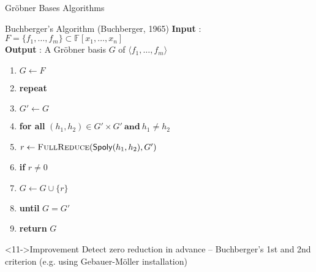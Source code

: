 \documentclass{beamer}
\newcommand{\Field}{\mathbb{F}}
\newcommand{\Ideal}[1]{\langle #1 \rangle}
\newcommand{\mpolyring}[3]{#1[#2_{1}, \ldots, #2_{#3}]}
\newcommand{\Spoly}[2]{\mathsf{Spoly}(#1, #2)}
\newcommand{\Grobner}{Gr\"{o}bner }
\newcommand{\Alg}[2]{\textsc{#1}(#2)}
\newcommand{\FullReduce}[1]{\Alg{FullReduce}{#1}}
\begin{document}
\begin{section}{\Grobner Bases Algorithms}



\begin{frame}{Buchberger's Algorithm (Buchberger, 1965)}
  \textbf{Input} : $F = \{ f_1, \ldots, f_m \} \subset \mpolyring{\Field}{x}{n}$\\
  \textbf{Output} : A \Grobner basis $G$ of $\Ideal{f_1, \ldots, f_m}$

  \begin{enumerate}
  \item<2-> $G \leftarrow F$
  \item<3-> \textbf{repeat}
  \item<4-> \quad $G' \leftarrow G$
  \item<5-> \quad \textbf{for all}
    $(h_1, h_2) \in G' \times G' \mathbf{\ and\ } h_1 \neq h_2$
  \item<6-> \qquad $r \leftarrow \FullReduce{ \Spoly{h_1}{h_2} , G'}$
  \item<7-> \qquad \textbf{if} $r \neq 0$
  \item<8-> \quad \qquad $G \leftarrow G \cup \{ r \}$
  \item<9-> \textbf{until} $G = G'$
  \item<10-> \textbf{return} $G$
  \end{enumerate}
  
  \begin{block}<11->{Improvement} Detect zero reduction in advance --
    Buchberger's 1st and 2nd criterion (e.g. using Gebauer-M\"{o}ller
    installation)
  \end{block}
  
\end{frame}



\end{section}
\end{document}
